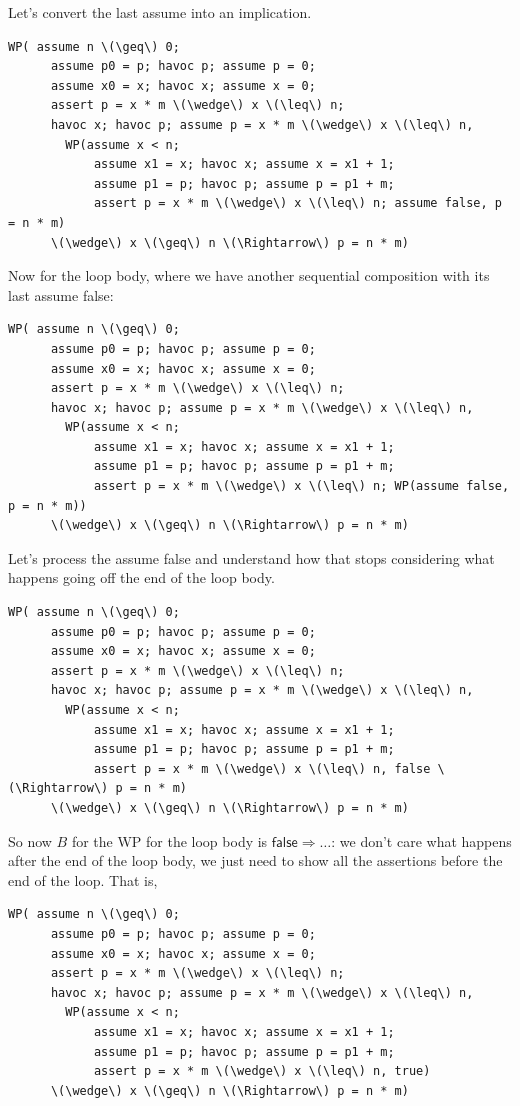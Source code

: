Let's convert the last \textsf{assume} into an implication.
\begin{Verbatim}[commandchars=\\\{\}]
  WP( assume n \(\geq\) 0;
      assume p0 = p; havoc p; assume p = 0; 
      assume x0 = x; havoc x; assume x = 0; 
      assert p = x * m \(\wedge\) x \(\leq\) n;
      havoc x; havoc p; assume p = x * m \(\wedge\) x \(\leq\) n,
        WP(assume x < n; 
            assume x1 = x; havoc x; assume x = x1 + 1; 
            assume p1 = p; havoc p; assume p = p1 + m; 
            assert p = x * m \(\wedge\) x \(\leq\) n; assume false, p = n * m)
      \(\wedge\) x \(\geq\) n \(\Rightarrow\) p = n * m)
\end{Verbatim}
\newpage
Now for the loop body, where we have another sequential composition with its last \textsf{assume false}:
\begin{Verbatim}[commandchars=\\\{\}]
  WP( assume n \(\geq\) 0;
      assume p0 = p; havoc p; assume p = 0; 
      assume x0 = x; havoc x; assume x = 0; 
      assert p = x * m \(\wedge\) x \(\leq\) n;
      havoc x; havoc p; assume p = x * m \(\wedge\) x \(\leq\) n,
        WP(assume x < n; 
            assume x1 = x; havoc x; assume x = x1 + 1; 
            assume p1 = p; havoc p; assume p = p1 + m; 
            assert p = x * m \(\wedge\) x \(\leq\) n; WP(assume false, p = n * m))
      \(\wedge\) x \(\geq\) n \(\Rightarrow\) p = n * m)
\end{Verbatim}
Let's process the \textsf{assume false} and understand how that stops considering what happens going off the end of the loop body.
\begin{Verbatim}[commandchars=\\\{\}]
  WP( assume n \(\geq\) 0;
      assume p0 = p; havoc p; assume p = 0; 
      assume x0 = x; havoc x; assume x = 0; 
      assert p = x * m \(\wedge\) x \(\leq\) n;
      havoc x; havoc p; assume p = x * m \(\wedge\) x \(\leq\) n,
        WP(assume x < n; 
            assume x1 = x; havoc x; assume x = x1 + 1; 
            assume p1 = p; havoc p; assume p = p1 + m; 
            assert p = x * m \(\wedge\) x \(\leq\) n, false \(\Rightarrow\) p = n * m)
      \(\wedge\) x \(\geq\) n \(\Rightarrow\) p = n * m)
\end{Verbatim}
So now $B$ for the WP for the loop body is $\mathsf{false} \Rightarrow \ldots$: we don't
care what happens after the end of the loop body, we just need to show all the assertions before the end of the loop.
That is,
\begin{Verbatim}[commandchars=\\\{\}]
  WP( assume n \(\geq\) 0;
      assume p0 = p; havoc p; assume p = 0; 
      assume x0 = x; havoc x; assume x = 0; 
      assert p = x * m \(\wedge\) x \(\leq\) n;
      havoc x; havoc p; assume p = x * m \(\wedge\) x \(\leq\) n,
        WP(assume x < n; 
            assume x1 = x; havoc x; assume x = x1 + 1; 
            assume p1 = p; havoc p; assume p = p1 + m; 
            assert p = x * m \(\wedge\) x \(\leq\) n, true)
      \(\wedge\) x \(\geq\) n \(\Rightarrow\) p = n * m)
\end{Verbatim}

